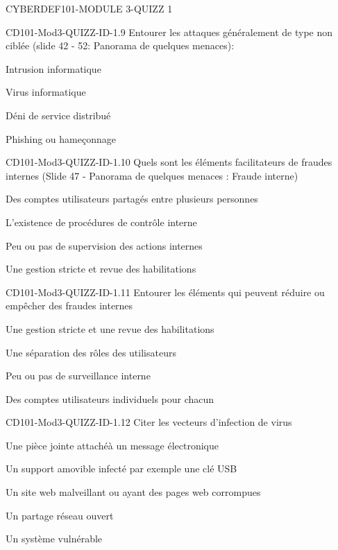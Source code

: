 \documentclass[12pt]{article}
\begin{document}
\begin{quiz}{CYBERDEF101-MODULE 3-QUIZZ 1}
\begin{multi}[multiple=true]{CD101-Mod3-QUIZZ-ID-1.9}
	Entourer les attaques g\'en\'eralement de type non  cibl\'ee  (slide 42 - 52: Panorama de quelques menaces):
\item 	Intrusion informatique
\item* 	Virus informatique
\item 	D\'eni de service distribu\'e
\item* 	Phishing ou hame\c{c}onnage
\end{multi}

\begin{multi}[multiple=true]{CD101-Mod3-QUIZZ-ID-1.10}
	Quels sont les \'el\'ements facilitateurs de fraudes internes (Slide 47 - Panorama de quelques menaces : Fraude interne)
\item* 	Des comptes utilisateurs partag\'es entre plusieurs personnes
\item 	L'existence de proc\'edures de contr\^ole interne
\item* 	Peu ou pas de supervision des actions internes
\item 	Une gestion stricte et revue des habilitations
\end{multi}

\begin{multi}[multiple=true]{CD101-Mod3-QUIZZ-ID-1.11}
	Entourer les \'el\'ements qui peuvent r\'eduire ou emp\^echer des fraudes internes
\item* 	Une gestion stricte et une revue des habilitations
\item* 	Une s\'eparation des rôles des utilisateurs
\item 	Peu ou pas de surveillance interne
\item* 	Des comptes utilisateurs individuels pour chacun
\end{multi}

\begin{multi}[multiple=true]{CD101-Mod3-QUIZZ-ID-1.12}
	Citer les vecteurs d'infection de virus 
\item* 	Une pi\`ece jointe attach\'e\`a un message \'electronique
\item* 	Un support amovible infect\'e par exemple une cl\'e USB
\item* 	Un site web malveillant ou ayant des pages web corrompues
\item* 	Un partage r\'eseau ouvert
\item* 	Un syst\`eme vuln\'erable
\end{multi}


\end{quiz}
\end{document}
